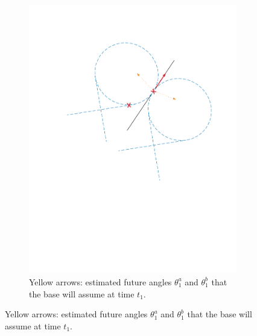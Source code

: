\begin{itemize}
\begin{figure}[!htbp]
\begin{subfigure}[b]{0.45\textwidth}
        \includegraphics[width=\textwidth]{img/circular_movment4.pdf}
        \caption{Yellow arrows: estimated future angles $\theta_1^a$ and $\theta_1^b$ that the base will assume at time $t_1$.}
        \label{fig:four}
   \end{subfigure}
   

\end{figure}
\end{itemize}
